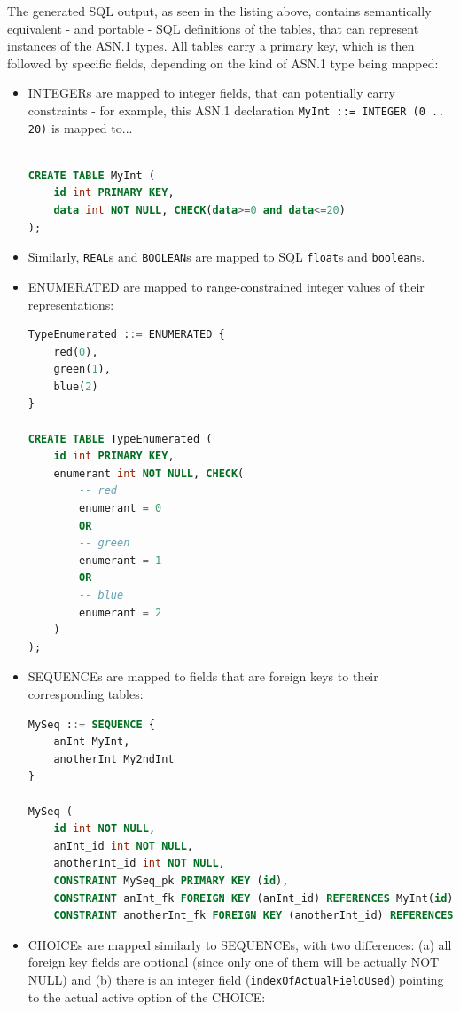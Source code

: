 \documentclass[11pt]{book}
\begin{document}
The generated SQL output, as seen in the listing above, contains semantically equivalent - and portable - SQL definitions of the tables, that can represent instances of the ASN.1 types. All tables carry a primary key, which is then followed by specific fields, depending on the kind of ASN.1 type being mapped:
\begin{itemize}
    \item INTEGERs are mapped to integer fields, that can potentially carry constraints - for example, this ASN.1 declaration {\tt MyInt ::= INTEGER (0 .. 20)} is mapped to...
\begin{lstlisting}[language=SQL]

CREATE TABLE MyInt (
    id int PRIMARY KEY,
    data int NOT NULL, CHECK(data>=0 and data<=20)
);
\end{lstlisting}
    \item Similarly, {\tt REAL}s and {\tt BOOLEAN}s are mapped to SQL {\tt float}s and {\tt boolean}s.
    \item ENUMERATED are mapped to range-constrained integer values of their representations:

\begin{lstlisting}[language=SQL]
TypeEnumerated ::= ENUMERATED {
    red(0),
    green(1),
    blue(2)
}

CREATE TABLE TypeEnumerated (
    id int PRIMARY KEY,
    enumerant int NOT NULL, CHECK(
        -- red
        enumerant = 0
        OR
        -- green
        enumerant = 1
        OR
        -- blue
        enumerant = 2
    )
);
\end{lstlisting}
    \item SEQUENCEs are mapped to fields that are foreign keys to their corresponding tables:
\begin{lstlisting}[language=SQL]
MySeq ::= SEQUENCE {
    anInt MyInt,
    anotherInt My2ndInt
}

MySeq (
    id int NOT NULL,
    anInt_id int NOT NULL,
    anotherInt_id int NOT NULL,
    CONSTRAINT MySeq_pk PRIMARY KEY (id),
    CONSTRAINT anInt_fk FOREIGN KEY (anInt_id) REFERENCES MyInt(id),
    CONSTRAINT anotherInt_fk FOREIGN KEY (anotherInt_id) REFERENCES My2ndInt(id));
\end{lstlisting}
    \item CHOICEs are mapped similarly to SEQUENCEs, with two differences: (a) all foreign key fields are optional (since only one of them will be actually NOT NULL) and (b) there is an integer field ({\tt indexOfActualFieldUsed}) pointing to the actual active option of the CHOICE:


\end{itemize}
\end{document}
